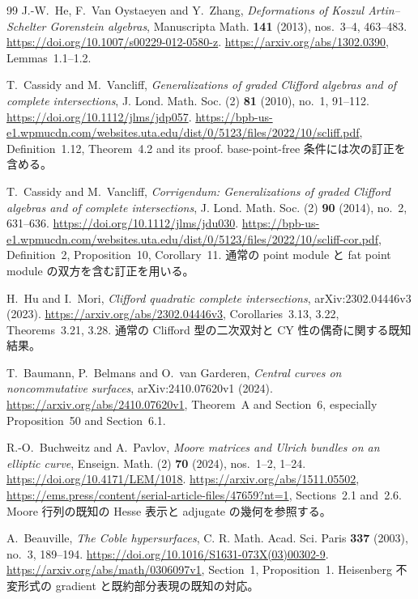 \begin{thebibliography}{99}
J.-W.~He, F.~Van Oystaeyen and Y.~Zhang,
\emph{Deformations of Koszul Artin--Schelter Gorenstein algebras},
Manuscripta Math. \textbf{141} (2013), nos.~3--4, 463--483.
\url{https://doi.org/10.1007/s00229-012-0580-z}.
\url{https://arxiv.org/abs/1302.0390}, Lemmas~1.1--1.2.

T.~Cassidy and M.~Vancliff,
\emph{Generalizations of graded Clifford algebras and of complete intersections},
J. Lond. Math. Soc. (2) \textbf{81} (2010), no.~1, 91--112.
\url{https://doi.org/10.1112/jlms/jdp057}.
\url{https://bpb-us-e1.wpmucdn.com/websites.uta.edu/dist/0/5123/files/2022/10/scliff.pdf},
Definition~1.12, Theorem~4.2 and its proof.
base-point-free 条件には次の訂正を含める。

T.~Cassidy and M.~Vancliff,
\emph{Corrigendum: Generalizations of graded Clifford algebras and of complete intersections},
J. Lond. Math. Soc. (2) \textbf{90} (2014), no.~2, 631--636.
\url{https://doi.org/10.1112/jlms/jdu030}.
\url{https://bpb-us-e1.wpmucdn.com/websites.uta.edu/dist/0/5123/files/2022/10/scliff-cor.pdf},
Definition~2, Proposition~10, Corollary~11.
通常の point module と fat point module の双方を含む訂正を用いる。

H.~Hu and I.~Mori,
\emph{Clifford quadratic complete intersections},
arXiv:2302.04446v3 (2023).
\url{https://arxiv.org/abs/2302.04446v3},
Corollaries~3.13, 3.22, Theorems~3.21, 3.28.
通常の Clifford 型の二次双対と CY 性の偶奇に関する既知結果。

T.~Baumann, P.~Belmans and O.~van Garderen,
\emph{Central curves on noncommutative surfaces},
arXiv:2410.07620v1 (2024).
\url{https://arxiv.org/abs/2410.07620v1},
Theorem~A and Section~6, especially Proposition~50 and Section~6.1.

R.-O.~Buchweitz and A.~Pavlov,
\emph{Moore matrices and Ulrich bundles on an elliptic curve},
Enseign. Math. (2) \textbf{70} (2024), nos.~1--2, 1--24.
\url{https://doi.org/10.4171/LEM/1018}.
\url{https://arxiv.org/abs/1511.05502},
\url{https://ems.press/content/serial-article-files/47659?nt=1},
Sections~2.1 and~2.6.
Moore 行列の既知の Hesse 表示と adjugate の幾何を参照する。

A.~Beauville,
\emph{The Coble hypersurfaces},
C. R. Math. Acad. Sci. Paris \textbf{337} (2003), no.~3, 189--194.
\url{https://doi.org/10.1016/S1631-073X(03)00302-9}.
\url{https://arxiv.org/abs/math/0306097v1}, Section~1, Proposition~1.
Heisenberg 不変形式の gradient と既約部分表現の既知の対応。


\end{thebibliography}
